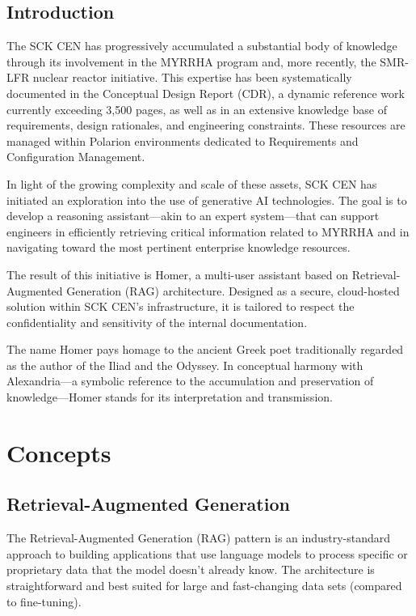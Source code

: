 \documentclass[11pt,a4paper]{report}
\begin{document}
\section{Introduction}

The SCK CEN has progressively accumulated a substantial body of knowledge through its involvement in the MYRRHA program and, more recently, the SMR-LFR nuclear reactor initiative. This expertise has been systematically documented in the Conceptual Design Report (CDR), a dynamic reference work currently exceeding 3,500 pages, as well as in an extensive knowledge base of requirements, design rationales, and engineering constraints. These resources are managed within Polarion environments dedicated to Requirements and Configuration Management.

In light of the growing complexity and scale of these assets, SCK CEN has initiated an exploration into the use of generative AI technologies. The goal is to develop a reasoning assistant—akin to an expert system—that can support engineers in efficiently retrieving critical information related to MYRRHA and in navigating toward the most pertinent enterprise knowledge resources.

The result of this initiative is Homer, a multi-user assistant based on Retrieval-Augmented Generation (RAG) architecture. Designed as a secure, cloud-hosted solution within SCK CEN's infrastructure, it is tailored to respect the confidentiality and sensitivity of the internal documentation.

The name Homer pays homage to the ancient Greek poet traditionally regarded as the author of the Iliad and the Odyssey. In conceptual harmony with Alexandria—a symbolic reference to the accumulation and preservation of knowledge—Homer stands for its interpretation and transmission\cite{berge2025specifications}.

\newpage
\chapter{Concepts}

\section{Retrieval-Augmented Generation}

The Retrieval-Augmented Generation (RAG) pattern is an industry-standard approach to building applications that use language models to process specific or proprietary data that the model doesn't already know. The architecture is straightforward and best suited for large and fast-changing data sets (compared to fine-tuning).
\end{document}
